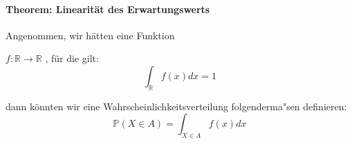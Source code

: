 \vspace{10pt}

\paragraph {Theorem: Linearit\"at des Erwartungswerts}

\vspace{5pt}

Angenommen, wir h\"atten eine Funktion
\vspace{3pt}

$f: \mathbb{R} \longrightarrow \mathbb{R}$ , f\"ur die gilt: 
\begin{equation*}
\int_{\mathbb{R}} f(x) dx = 1
\end{equation*}

\vspace{3pt}

dann k\"onnten wir eine Wahrscheinlichkeitsverteilung folgenderma"sen definieren:
\begin{equation*}
\mathbb{P} ({X\in A}) = \int_{X \in A} f(x) dx
\end{equation*}


